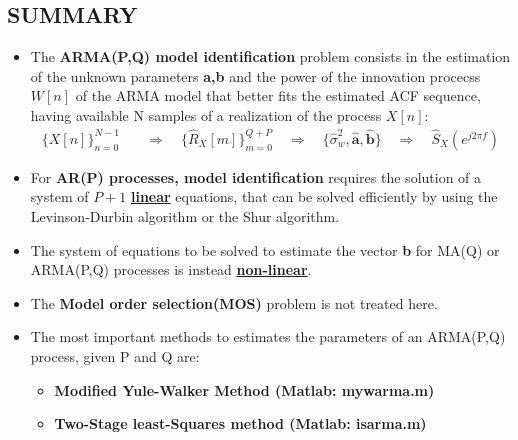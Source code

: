 \subsection{SUMMARY}
\begin{itemize}
    \item The \textbf{ARMA(P,Q) model identification} problem consists in the estimation of the unknown parameters \textbf{a,b} and the power of the innovation procecss \(W[n]\) of the ARMA model that better fits the estimated ACF sequence, having available N samples of a realization of the process \(X[n]\):
\begin{align*}
\{X[n]\}_{n=0}^{N-1}
&\quad\Rightarrow\quad
\{\hat{R}_X[m]\}_{m=0}^{Q+P}
\quad\Rightarrow\quad
\{\hat{\sigma}_w^{2}, \hat{\mathbf{a}}, \hat{\mathbf{b}}\}
\quad\Rightarrow\quad
\hat{S}_X\!\left(e^{j 2\pi f}\right)
\end{align*}

    \item For \textbf{AR(P) processes, model identification} requires the solution of a system of \(P+1\) \underline{\textbf{linear}} equations, that can be solved efficiently by using the Levinson-Durbin algorithm or the Shur algorithm.
    \item The system of equations to be solved to estimate the vector \textbf{b} for MA(Q) or ARMA(P,Q) processes is instead \underline{\textbf{non-linear}}.
    \item The \textbf{Model order selection(MOS)} problem is not treated here.

    \item The most important methods to estimates the parameters of an ARMA(P,Q) process,  given P and Q are:
    \begin{itemize}
        \item \textbf{Modified Yule-Walker Method (Matlab: mywarma.m)}
        \item \textbf{Two-Stage least-Squares method (Matlab: isarma.m)}
    \end{itemize}
\end{itemize}

\clearpage